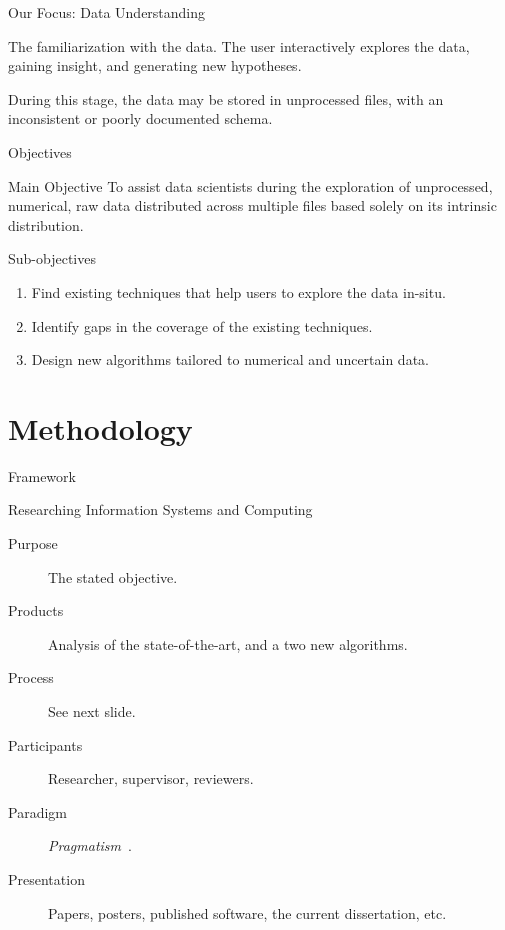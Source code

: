 \documentclass[10pt]{beamer}
\begin{document}
\begin{frame}{Our Focus: Data Understanding}

The \alert{familiarization with the data}. The user interactively explores the
data, gaining insight, and generating new hypotheses.

During this stage, the data may be stored in unprocessed files, with an
inconsistent or poorly documented schema.

\end{frame}

\begin{frame}{Objectives}
\begin{alertblock}{Main Objective}
    \smallskip
    To assist data scientists during the exploration of unprocessed, numerical, raw data distributed across multiple
    files based solely on its intrinsic distribution.
\end{alertblock}

\begin{block}{Sub-objectives}
    \begin{enumerate}
        \item Find existing techniques that help users to explore the data in-situ.
        \item Identify gaps in the coverage of the existing techniques.
        \item Design new algorithms tailored to numerical and uncertain data.
    \end{enumerate}
\end{block}
\end{frame}



\section{Methodology}

\begin{frame}{Framework}
\begin{block}{\alert{Researching Information Systems and Computing}~\cite{Oates2006}}

\begin{description}
    \item[Purpose] The stated objective.
    \item[Products] Analysis of the state-of-the-art, and a two new algorithms.
    \item[Process] See next slide.
    \item[Participants] Researcher, supervisor, reviewers.
    \item[Paradigm] \emph{Pragmatism}~\cite{Shull2008}.
    \item[Presentation] Papers, posters, published software, the current dissertation, etc.
\end{description}

\end{block}
\end{frame}
\end{document}
